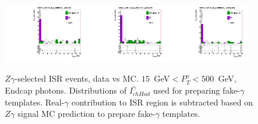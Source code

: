 \begin{figure}[htb]
\begin{center}
\includegraphics[width=0.32\textwidth]{../figs/figs_v11/MUON_ZGamma/PrepareYields/c_TotalDATAvsMC_Endcap__phoPFChIsoCorrFSR_EXCLUDED_pt85to95_.pdf}\includegraphics[width=0.32\textwidth]{../figs/figs_v11/MUON_ZGamma/PrepareYields/c_TotalDATAvsMC_Endcap__phoPFChIsoCorrFSR_EXCLUDED_pt95to120_.pdf}\includegraphics[width=0.32\textwidth]{../figs/figs_v11/MUON_ZGamma/PrepareYields/c_TotalDATAvsMC_Endcap__phoPFChIsoCorrFSR_EXCLUDED_pt120to500_.pdf}\\
  \caption{$Z\gamma$-selected ISR events, data vs MC. $15$~GeV$<P_T^{\gamma}<500$~GeV, Endcap photons. Distributions of $I_{chHad}^{\gamma}$ used for preparing fake-$\gamma$ templates. Real-$\gamma$ contribution to ISR region is subtracted based on $Z\gamma$ signal MC prediction to prepare fake-$\gamma$ templates.}
  \label{fig:Zg_ISR_phoPFChIsoCorr_Endcap}
  \end{center}
\end{figure}


